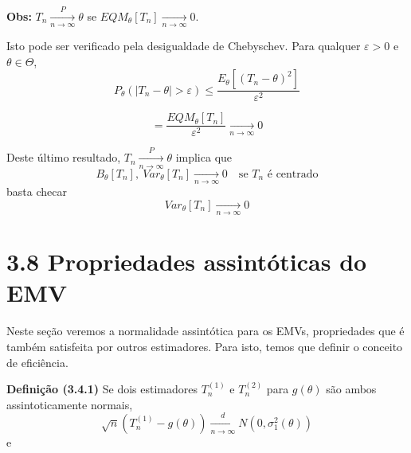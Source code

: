 \textbf{Obs:} $T_n \xrightarrow[n \to \infty]{P} \theta$ se $EQM_\theta[T_n] \xrightarrow[n \to \infty]{} 0$.

Isto pode ser verificado pela desigualdade de Chebyschev. Para qualquer $\varepsilon > 0$ e $\theta \in \Theta$,
\begin{equation}
P_\theta\left( |T_n - \theta| > \varepsilon \right) \leq \frac{E_\theta\left[ (T_n - \theta)^2 \right]}{\varepsilon^2}
\end{equation}

\begin{equation}
= \frac{EQM_\theta[T_n]}{\varepsilon^2} \xrightarrow[n \to \infty]{} 0
\end{equation}

Deste último resultado, $T_n \xrightarrow[n \to \infty]{P} \theta$ implica que
\[
B_\theta[T_n], \ Var_\theta[T_n] \xrightarrow[n \to \infty]{} 0 \quad \text{se $T_n$ é centrado}
\]
basta checar
\[
Var_\theta[T_n] \xrightarrow[n \to \infty]{} 0
\]

\section*{3.8 Propriedades assintóticas do EMV}

Neste seção veremos a normalidade assintótica para os EMVs, propriedades que é também satisfeita por outros estimadores. Para isto, temos que definir o conceito de eficiência.

\textbf{Definição (3.4.1)} Se dois estimadores $T_n^{(1)}$ e $T_n^{(2)}$ para $g(\theta)$ são ambos assintoticamente normais,
\begin{equation}
\sqrt{n} \left( T_n^{(1)} - g(\theta) \right) \xrightarrow[n \to \infty]{d} N\left(0, \sigma_1^2(\theta)\right)
\end{equation}
e